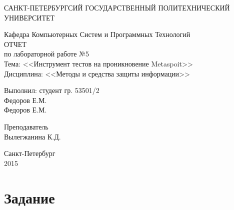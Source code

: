 \documentclass[utf8x, 12pt]{G7-32}
\begin{document}
\frontmatter 


\begin{center} 

\large САНКТ-ПЕТЕРБУРГСИЙ ГОСУДАРСТВЕННЫЙ ПОЛИТЕХНИЧЕСКИЙ УНИВЕРСИТЕТ

\large Кафедра Компьютерных Систем и Программных Технологий \\[5.5cm] 

\huge ОТЧЕТ \\[0.6cm] %
\large по лабораторной работе №5\\
\large Тема: <<Инструмент тестов на проникновение Metaspoit>>\\
\large Дисциплина: <<Методы и средства защиты информации>>\\[3.7cm]

\end{center} 

\begin{flushright}
Выполнил: студент гр. 53501/2 \\
Федоров Е.М. \\[1.2cm]
Федоров Е.М.

Преподаватель \\
Вылегжанина К.Д.
\end{flushright}


\vfill 

\begin{center} 
\large Санкт-Петербург \\
2015
\end{center} 

\thispagestyle{empty}



\thispagestyle{empty}
\setcounter{page}{0}
\tableofcontents
\clearpage
\mainmatter


\chapter{Задание}
\end{document}
